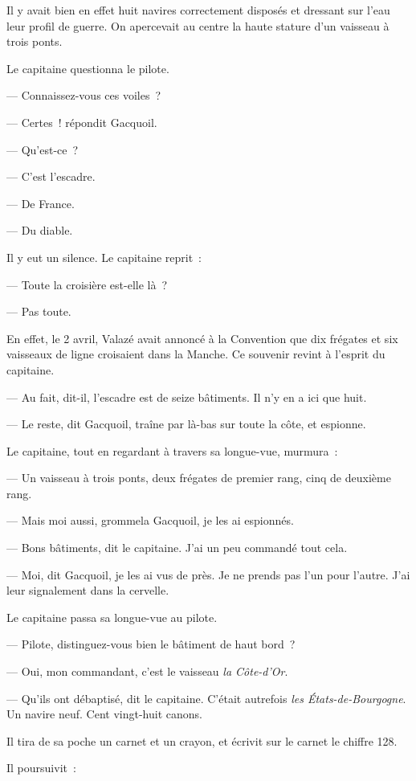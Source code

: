 \documentclass[french,twoside]{book} %
\begin{document}
Il y avait bien en effet huit navires correctement disposés et dressant sur l’eau leur profil de guerre. On apercevait au centre la haute stature d’un vaisseau à trois ponts.\par
Le capitaine questionna le pilote.\par
— Connaissez-vous ces voiles ?\par
— Certes ! répondit Gacquoil.\par
— Qu’est-ce ?\par
— C’est l’escadre.\par
— De France.\par
— Du diable.\par
Il y eut un silence. Le capitaine reprit :\par
— Toute la croisière est-elle là ?\par
— Pas toute.\par
En effet, le 2 avril, Valazé avait annoncé à la Convention que dix frégates et six vaisseaux de ligne  croisaient dans la Manche. Ce souvenir revint à l’esprit du capitaine.\par
— Au fait, dit-il, l’escadre est de seize bâtiments. Il n’y en a ici que huit.\par
— Le reste, dit Gacquoil, traîne par là-bas sur toute la côte, et espionne.\par
Le capitaine, tout en regardant à travers sa longue-vue, murmura :\par
— Un vaisseau à trois ponts, deux frégates de premier rang, cinq de deuxième rang.\par
— Mais moi aussi, grommela Gacquoil, je les ai espionnés.\par
— Bons bâtiments, dit le capitaine. J’ai un peu commandé tout cela.\par
— Moi, dit Gacquoil, je les ai vus de près. Je ne prends pas l’un pour l’autre. J’ai leur signalement dans la cervelle.\par
Le capitaine passa sa longue-vue au pilote.\par
— Pilote, distinguez-vous bien le bâtiment de haut bord ?\par
— Oui, mon commandant, c’est le vaisseau \emph{la Côte-d’Or}.\par
— Qu’ils ont débaptisé, dit le capitaine. C’était autrefois \emph{les États-de-Bourgogne}. Un navire neuf. Cent vingt-huit canons.\par
Il tira de sa poche un carnet et un crayon, et écrivit sur le carnet le chiffre 128.\par
Il poursuivit :\par
\end{document}
